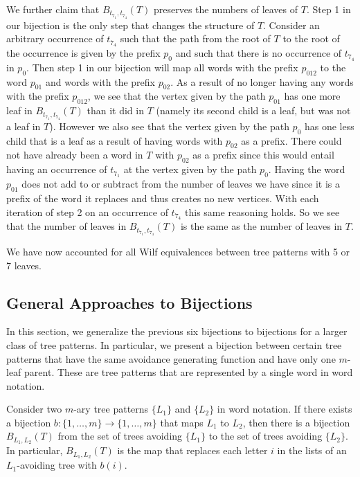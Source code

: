 \documentclass[12pt]{article}
\begin{document}
We further claim that $B_{t_{7_1},t_{7_4}}(T)$ preserves the numbers of leaves of $T$.  Step 1 in our bijection is the only step that changes the structure of $T$. Consider an arbitrary occurrence of $t_{7_4}$ such that the path from the root of $T$ to the root of the occurrence is given by the prefix $p_0$ and such that there is no occurrence of $t_{7_4}$ in $p_0$. Then step 1 in our bijection will map all words with the prefix $p_012$ to the word $p_01$ and words with the prefix $p_02$. As a result of no longer having any words with the prefix $p_012$, we see that the vertex given by the path $p_01$ has one more leaf in $B_{t_{7_1},t_{7_4}}(T)$ than it did in $T$ (namely its second child is a leaf, but was not a leaf in $T$). However we also see that the vertex given by the path $p_0$ has one less child that is a leaf as a result of having words with $p_02$ as a prefix. There could not have already been a word in $T$ with $p_02$ as a prefix since this would entail having an occurrence of $t_{7_1}$ at the vertex given by the path $p_0$. Having the word $p_01$ does not add to or subtract from the number of leaves we have since it is a prefix of the word it replaces and thus creates no new vertices. With each iteration of step 2 on an occurrence of $t_{7_4}$ this same reasoning holds. So we see that the number of leaves in $B_{t_{7_1},t_{7_4}}(T)$ is the same as the number of leaves in $T$.

We have now accounted for all Wilf equivalences between tree patterns with 5 or 7 leaves.

\subsection{General Approaches to Bijections}

In this section, we generalize the previous six bijections to bijections for a larger class of tree patterns.  In particular, we present a bijection between certain tree patterns that have the same avoidance generating function and have only one $m$-leaf parent.  These are tree patterns that are represented by a single word in word notation.

Consider two $m$-ary tree patterns $\{L_1\}$ and $\{L_2\}$ in word notation.  If there exists a bijection $b: \{1,\dots , m\} \to \{1, \dots , m\}$ that maps $L_1$ to $L_2$, then there is a bijection $B_{L_1,L_2}(T)$ from the set of trees avoiding $\{L_1\}$ to the set of trees avoiding $\{L_2\}$.  In particular, $B_{L_1,L_2}(T)$ is the map that replaces each letter $i$ in the lists of an $L_1$-avoiding tree with $b(i)$.
\end{document}
